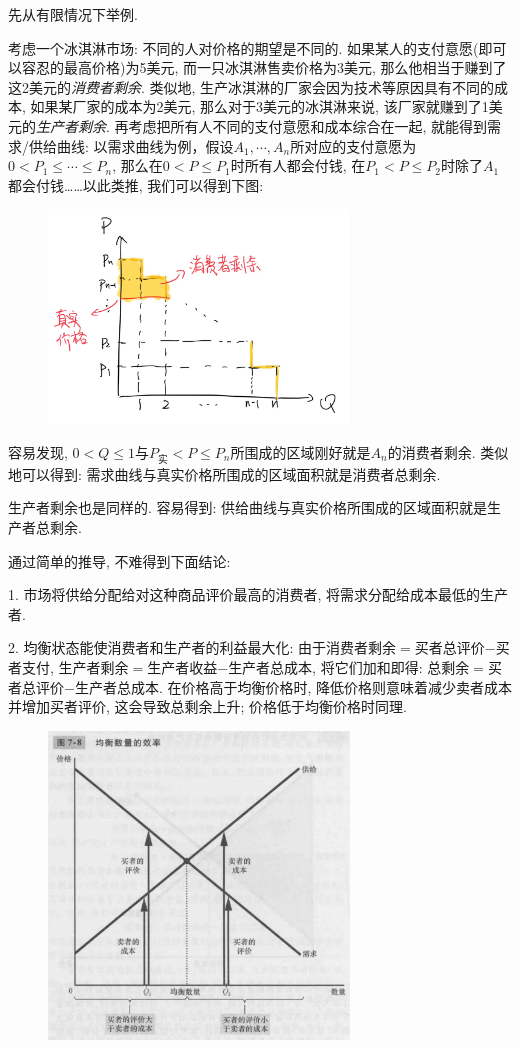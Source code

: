 先从有限情况下举例. 

考虑一个冰淇淋市场: 不同的人对价格的期望是不同的. 如果某人的支付意愿(即可以容忍的最高价格)为5美元, 而一只冰淇淋售卖价格为3美元, 那么他相当于赚到了这2美元的\textit{消费者剩余}. 类似地, 生产冰淇淋的厂家会因为技术等原因具有不同的成本, 如果某厂家的成本为2美元, 那么对于3美元的冰淇淋来说, 该厂家就赚到了1美元的\textit{生产者剩余}. 再考虑把所有人不同的支付意愿和成本综合在一起, 就能得到需求/供给曲线: 以需求曲线为例，假设$A_1,\cdots ,A_n$所对应的支付意愿为$0<P_1 \leq \cdots \leq P_n$, 那么在$0<P \leq P_1$时所有人都会付钱, 在$P_1<P \leq P_2$时除了$A_1$都会付钱……以此类推, 我们可以得到下图: 

\begin{figure}[H]
	\centering
	\includegraphics[width=8cm]{attachment/image-20231125092517427.png}
\end{figure}

容易发现, $0<Q\leq 1$与$P_{实} < P \leq P_n$所围成的区域刚好就是$A_n$的消费者剩余. 类似地可以得到: 需求曲线与真实价格所围成的区域面积就是消费者总剩余. 

生产者剩余也是同样的. 容易得到: 供给曲线与真实价格所围成的区域面积就是生产者总剩余. 

通过简单的推导, 不难得到下面结论: 

1. 市场将供给分配给对这种商品评价最高的消费者, 将需求分配给成本最低的生产者. 

2. 均衡状态能使消费者和生产者的利益最大化: 由于消费者剩余$=$买者总评价$-$买者支付, 生产者剩余$=$生产者收益$-$生产者总成本, 将它们加和即得: 总剩余$=$买者总评价$-$生产者总成本. 在价格高于均衡价格时, 降低价格则意味着减少卖者成本并增加买者评价, 这会导致总剩余上升; 价格低于均衡价格时同理. 

\begin{figure}[H]
	\centering
	\includegraphics[width=8cm]{attachment/Fig7_8.png}
\end{figure}

